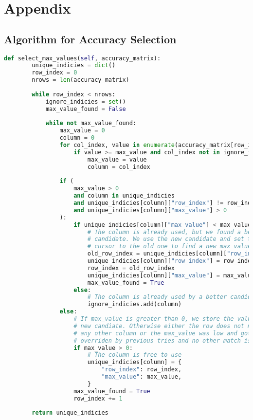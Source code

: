 \section{Appendix}

\subsection{Algorithm for Accuracy Selection}

\begin{lstlisting}[language=Python, caption=Select relevant accuracy values from a accuracy matrix., label={lst:select_max_values}]
    def select_max_values(self, accuracy_matrix):
        unique_indicies = dict()
        row_index = 0
        nrows = len(accuracy_matrix)
        
        while row_index < nrows:
            ignore_indicies = set()
            max_value_found = False
    
            while not max_value_found:
                max_value = 0
                column = 0
                for col_index, value in enumerate(accuracy_matrix[row_index]):
                    if value >= max_value and col_index not in ignore_indicies:
                        max_value = value
                        column = col_index
    
                if (
                    max_value > 0
                    and column in unique_indicies
                    and unique_indicies[column]["row_index"] != row_index
                    and unique_indicies[column]["max_value"] > 0
                ):
                    if unique_indicies[column]["max_value"] < max_value:
                        # The column is already used, but we found a better 
                        # candidate. We use the new candidate and set the 
                        # cursor to the old one to find a new max value.
                        old_row_index = unique_indicies[column]["row_index"]
                        unique_indicies[column]["row_index"] = row_index
                        row_index = old_row_index
                        unique_indicies[column]["max_value"] = max_value
                        max_value_found = True
                    else:
                        # The column is already used by a better candidate.
                        ignore_indicies.add(column)
                else:
                    # If max_value is greater than 0, we store the value as a 
                    # new candiate. Otherwise either the row does not match 
                    # any other column or the max_value was low and got 
                    # overriden by previous tries and no other match is available. 
                    if max_value > 0:
                        # The column is free to use
                        unique_indicies[column] = {
                            "row_index": row_index,
                            "max_value": max_value,
                        }
                    max_value_found = True
                    row_index += 1
        
        return unique_indicies
\end{lstlisting}
    